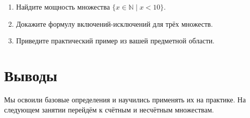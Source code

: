 \begin{enumerate}
  \item Найдите мощность множества $\{x \in \mathbb{N} \mid x < 10\}$.
  \item Докажите формулу включений-исключений для трёх множеств.
  \item Приведите практический пример из вашей предметной области.
\end{enumerate}

\section{Выводы}

\begin{keyidea}
Мы освоили базовые определения и научились применять их на практике.
На следующем занятии перейдём к счётным и несчётным множествам.
\end{keyidea}

